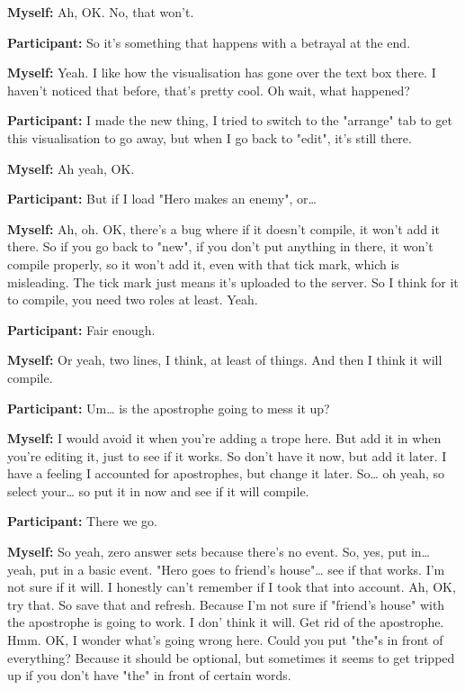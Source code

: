 \documentclass[11pt]{report}
\begin{document}
\begin{linenumbers}
\textbf{Myself:} Ah, OK. No, that won't.

\textbf{Participant:} So it's something that happens with a betrayal at the end.

\textbf{Myself:} Yeah. I like how the visualisation has gone over the text box there. I haven't noticed that before, that's pretty cool. Oh wait, what happened?

\textbf{Participant:} I made the new thing, I tried to switch to the "arrange" tab to get this visualisation to go away, but when I go back to "edit", it's still there.

\textbf{Myself:} Ah yeah, OK.

\textbf{Participant:} But if I load "Hero makes an enemy", or\ldots{}

\textbf{Myself:} Ah, oh. OK, there's a bug where if it doesn't compile, it won't add it there. So if you go back to "new", if you don't put anything in there, it won't compile properly, so it won't add it, even with that tick mark, which is misleading. The tick mark just means it's uploaded to the server. So I think for it to compile, you need two roles at least. Yeah.

\textbf{Participant:} Fair enough.

\textbf{Myself:} Or yeah, two lines, I think, at least of things. And then I think it will compile.

\textbf{Participant:} Um\ldots{} is the apostrophe going to mess it up?

\textbf{Myself:} I would avoid it when you're adding a trope here. But add it in when you're editing it, just to see if it works. So don't have it now, but add it later. I have a feeling I accounted for apostrophes, but change it later. So\ldots{} oh yeah, so select your\ldots{} so put it in now and see if it will compile.

\textbf{Participant:} There we go.

\textbf{Myself:} So yeah, zero answer sets because there's no event. So, yes, put in\ldots{} yeah, put in a basic event. "Hero goes to friend's house"\ldots{} see if that works. I'm not sure if it will. I honestly can't remember if I took that into account. Ah, OK, try that. So save that and refresh. Because I'm not sure if "friend's house" with the apostrophe is going to work. I don' think it will. Get rid of the apostrophe. Hmm. OK, I wonder what's going wrong here. Could you put "the"s in front of everything? Because it should be optional, but sometimes it seems to get tripped up if you don't have "the" in front of certain words.


\end{linenumbers}
\end{document}

